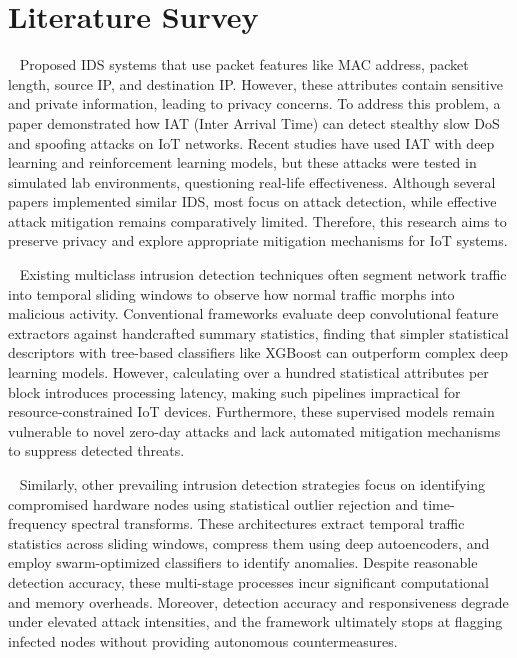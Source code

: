 \documentclass[]{interact}
\theoremstyle{plain}%
\theoremstyle{definition}
\theoremstyle{remark}
\begin{document}
\section{Literature Survey}

~\cite{ppdowdaorsuttf2026} Proposed IDS systems that use packet features like MAC address, packet length, source IP, and destination IP. However, these attributes contain sensitive and private information, leading to privacy concerns. To address this problem, a paper demonstrated how IAT (Inter Arrival Time) can detect stealthy slow DoS and spoofing attacks on IoT networks. Recent studies have used IAT with deep learning and reinforcement learning models, but these attacks were tested in simulated lab environments, questioning real-life effectiveness. Although several papers implemented similar IDS, most focus on attack detection, while effective attack mitigation remains comparatively limited. Therefore, this research aims to preserve privacy and explore appropriate mitigation mechanisms for IoT systems.

~\cite{whffi2026} Existing multiclass intrusion detection techniques often segment network traffic into temporal sliding windows to observe how normal traffic morphs into malicious activity. Conventional frameworks evaluate deep convolutional feature extractors against handcrafted summary statistics, finding that simpler statistical descriptors with tree-based classifiers like XGBoost can outperform complex deep learning models. However, calculating over a hundred statistical attributes per block introduces processing latency, making such pipelines impractical for resource-constrained IoT devices. Furthermore, these supervised models remain vulnerable to novel zero-day attacks and lack automated mitigation mechanisms to suppress detected threats.

~\cite{wtai2025} Similarly, other prevailing intrusion detection strategies focus on identifying compromised hardware nodes using statistical outlier rejection and time-frequency spectral transforms. These architectures extract temporal traffic statistics across sliding windows, compress them using deep autoencoders, and employ swarm-optimized classifiers to identify anomalies. Despite reasonable detection accuracy, these multi-stage processes incur significant computational and memory overheads. Moreover, detection accuracy and responsiveness degrade under elevated attack intensities, and the framework ultimately stops at flagging infected nodes without providing autonomous countermeasures.
\end{document}
